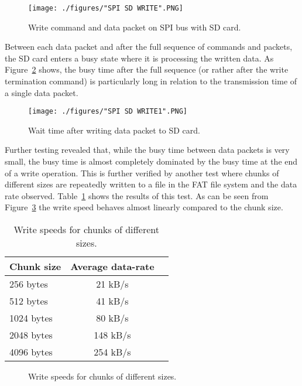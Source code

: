 \begin{figure}[H]
    \centering \texttt{[image: ./figures/"SPI SD WRITE".PNG]}
    \caption{Write command and data packet on SPI bus with SD card.}
    \label{fig:sd_card_write}
\end{figure}

Between each data packet and after the full sequence of commands and packets, the SD card enters a busy state where it is processing the written data. As Figure~\ref{fig:sd_card_write_wait} shows, the busy time after the full sequence (or rather after the write termination command) is particularly long in relation to the transmission time of a single data packet.

\begin{figure}[H]
    \centering \texttt{[image: ./figures/"SPI SD WRITE1".PNG]}
    \caption{Wait time after writing data packet to SD card.}
    \label{fig:sd_card_write_wait}
\end{figure}

Further testing revealed that, while the busy time between data packets is very small, the busy time is almost completely dominated by the busy time at the end of a write operation. This is further verified by another test where chunks of different sizes are repeatedly written to a file in the FAT file system and the data rate observed. Table~\ref{tab:write_speed} shows the results of this test. As can be seen from Figure~\ref{fig:write_speed} the write speed behaves almost linearly compared to the chunk size.

\begin{table}[htbp]
    \caption{Write speeds for chunks of different sizes.}
    \label{tab:write_speed}
    \centering\begin{tabular}{@{}lcr@{}} \toprule
    \textbf{Chunk size} & \textbf{Average data-rate} \\ \midrule
        256 bytes & 21 kB/s \\
        512 bytes & 41 kB/s \\
        1024 bytes & 80 kB/s \\
        2048 bytes & 148 kB/s \\
        4096 bytes & 254 kB/s \\ \bottomrule
    \end{tabular}
\end{table}

\begin{figure}[H]
\centering
{}
\caption{Write speeds for chunks of different sizes.}
\label{fig:write_speed}
\end{figure}

